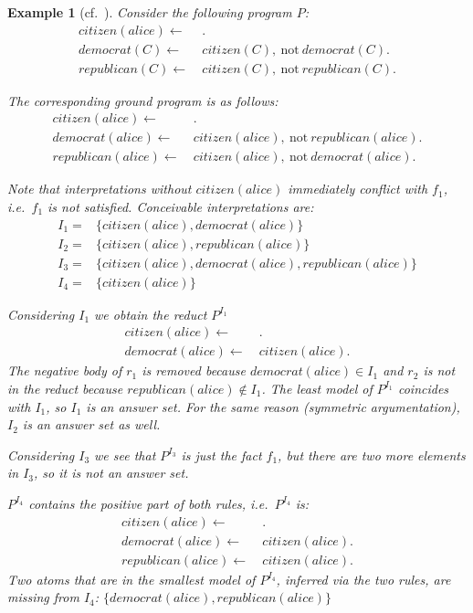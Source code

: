 \documentclass[final]{vutinfth} %
\newtheorem{example}{Example}[chapter]
\newcommand{\fail}{\mathrm{not } \ \xspace}
\newcommand{\from}{\ensuremath{\leftarrow}}
\begin{document}
\begin{example}[{cf.~\cite[Example 16]{DBLP:conf/rweb/EiterIK09}}]
Consider the following program $P$:
\begin{align*}
citizen(alice)\from& \ .\\
democrat(C) \from& \ citizen(C),~\fail democrat(C).\\
republican(C) \from& \ citizen(C),~\fail republican(C).
\end{align*}

The corresponding ground program is as follows:
\begin{align}
citizen(alice)\from& \ . \tag{$f_1$} \\
democrat(alice) \from& \ citizen(alice),~\fail republican(alice). \tag{$r_1$} \\
republican(alice) \from& \ citizen(alice),~\fail democrat(alice). \tag{$r_2$} 
\end{align}

Note that interpretations without $citizen(alice)$ immediately conflict with $f_1$, i.e.~$f_1$ is not satisfied. Conceivable interpretations are:
\begin{align*}
I_1 =& \{ citizen(alice), democrat(alice) \}\\
I_2 =& \{ citizen(alice), republican(alice) \}\\
I_3 =& \{ citizen(alice), democrat(alice), republican(alice) \}\\
I_4 =& \{ citizen(alice) \}
\end{align*}

Considering $I_1$ we obtain the reduct $P^{I_1}$
\begin{align*}
citizen(alice)\from& \ .\\
democrat(alice) \from& \ citizen(alice).
\end{align*}
The negative body of $r_1$ is removed because $democrat(alice) \in I_1$ and $r_2$ is not in the reduct because $republican(alice) \not \in I_1$. The least model of $P^{I_1}$ coincides with $I_1$, so $I_1$ is an answer set. For the same reason (symmetric argumentation), $I_2$ is an answer set as well.

Considering $I_3$ we see that $P^{I_3}$ is just the fact $f_1$, but there are two more elements in $I_3$, so it is not an answer set.

$P^{I_4}$ contains the positive part of both rules, i.e.~$P^{I_4}$ is:
\begin{align*}
citizen(alice)\from& \ . \\
democrat(alice) \from& \ citizen(alice). \\
republican(alice) \from& \ citizen(alice).
\end{align*}
Two atoms that are in the smallest model of $P^{I_4}$, inferred via the two rules, are missing from $I_4$: $\{democrat(alice), republican(alice) \}$
\end{example}
\end{document}
